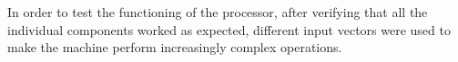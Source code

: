 In order to test the functioning of the processor, after verifying that all the individual components worked as expected, different input vectors were used to make the machine perform increasingly complex operations.
